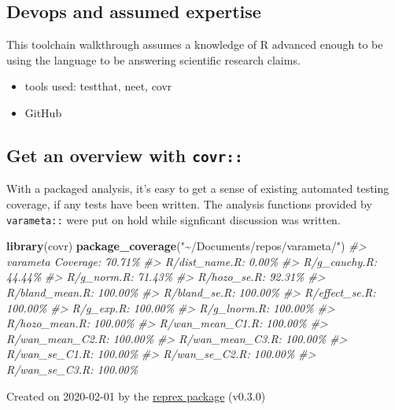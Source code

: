 \documentclass[
]{article}
\newenvironment{Shaded}{\begin{snugshade}}{\end{snugshade}}
\newcommand{\CommentTok}[1]{\textcolor[rgb]{0.56,0.35,0.01}{\textit{#1}}}
\newcommand{\KeywordTok}[1]{\textcolor[rgb]{0.13,0.29,0.53}{\textbf{#1}}}
\newcommand{\NormalTok}[1]{#1}
\newcommand{\StringTok}[1]{\textcolor[rgb]{0.31,0.60,0.02}{#1}}
\providecommand{\tightlist}{%
  \setlength{\itemsep}{0pt}\setlength{\parskip}{0pt}}
\begin{document}
\hypertarget{devops-and-assumed-expertise}{%
\subsection{Devops and assumed
expertise}\label{devops-and-assumed-expertise}}

This toolchain walkthrough assumes a knowledge of R advanced enough to
be using the language to be answering scientific research claims.

\begin{itemize}
\tightlist
\item
  tools used: testthat, neet, covr
\item
  GitHub
\end{itemize}

\hypertarget{get-an-overview-with-covr}{%
\subsection{\texorpdfstring{Get an overview with
\texttt{covr::}}{Get an overview with covr::}}\label{get-an-overview-with-covr}}

With a packaged analysis, it's easy to get a sense of existing automated
testing coverage, if any tests have been written. The analysis functions
provided by \texttt{varameta::} were put on hold while signficant
discussion was written.

\begin{Shaded}
\begin{Highlighting}[]
\KeywordTok{library}\NormalTok{(covr)}
\KeywordTok{package\_coverage}\NormalTok{(}\StringTok{"\textasciitilde{}/Documents/repos/varameta/"}\NormalTok{)}
\CommentTok{\#> varameta Coverage: 70.71\%}
\CommentTok{\#> R/dist\_name.R: 0.00\%}
\CommentTok{\#> R/g\_cauchy.R: 44.44\%}
\CommentTok{\#> R/g\_norm.R: 71.43\%}
\CommentTok{\#> R/hozo\_se.R: 92.31\%}
\CommentTok{\#> R/bland\_mean.R: 100.00\%}
\CommentTok{\#> R/bland\_se.R: 100.00\%}
\CommentTok{\#> R/effect\_se.R: 100.00\%}
\CommentTok{\#> R/g\_exp.R: 100.00\%}
\CommentTok{\#> R/g\_lnorm.R: 100.00\%}
\CommentTok{\#> R/hozo\_mean.R: 100.00\%}
\CommentTok{\#> R/wan\_mean\_C1.R: 100.00\%}
\CommentTok{\#> R/wan\_mean\_C2.R: 100.00\%}
\CommentTok{\#> R/wan\_mean\_C3.R: 100.00\%}
\CommentTok{\#> R/wan\_se\_C1.R: 100.00\%}
\CommentTok{\#> R/wan\_se\_C2.R: 100.00\%}
\CommentTok{\#> R/wan\_se\_C3.R: 100.00\%}
\end{Highlighting}
\end{Shaded}

Created on 2020-02-01 by the \href{https://reprex.tidyverse.org}{reprex
package} (v0.3.0)
\end{document}
